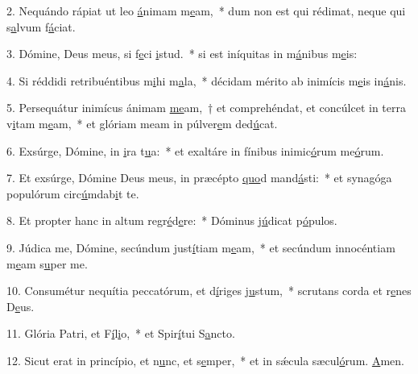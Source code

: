2. Nequándo rápiat ut leo \uline{á}nimam m\uline{e}am,~* dum non est qui rédimat, neque qui s\uline{a}lvum f\uline{á}ciat.\par 
3. Dómine, Deus meus, si f\uline{e}ci \uline{i}stud.~* si est iníquitas in m\uline{á}nibus m\uline{e}is:\par 
4. Si réddidi retribuéntibus m\uline{i}hi m\uline{a}la,~* décidam mérito ab inimícis m\uline{e}is in\uline{á}nis.\par 
5. Persequátur inimícus ánimam \uline{me}am,~† et comprehéndat, et concúlcet in terra v\uline{i}tam m\uline{e}am,~* et glóriam meam in púlver\uline{e}m ded\uline{ú}cat.\par 
6. Exsúrge, Dómine, in \uline{i}ra t\uline{u}a:~* et exaltáre in fínibus inimic\uline{ó}rum me\uline{ó}rum.\par 
7. Et exsúrge, Dómine Deus meus, in præcépto \uline{quo}d mand\uline{á}sti:~* et synagóga populórum circ\uline{ú}mdab\uline{i}t te.\par 
8. Et propter hanc in altum regr\uline{é}d\uline{e}re:~* Dóminus j\uline{ú}dicat p\uline{ó}pulos.\par 
9. Júdica me, Dómine, secúndum just\uline{í}tiam m\uline{e}am,~* et secúndum innocéntiam m\uline{e}am s\uline{u}per me.\par 
10. Consumétur nequítia peccatórum, et d\uline{í}riges j\uline{u}stum,~* scrutans corda et r\uline{e}nes D\uline{e}us.\par 
11. Glória Patri, et F\uline{í}l\uline{i}o,~* et Spir\uline{í}tui S\uline{a}ncto.\par 
12. Sicut erat in princípio, et n\uline{u}nc, et s\uline{e}mper,~* et in sǽcula sæcul\uline{ó}rum. \uline{A}men.\par 
